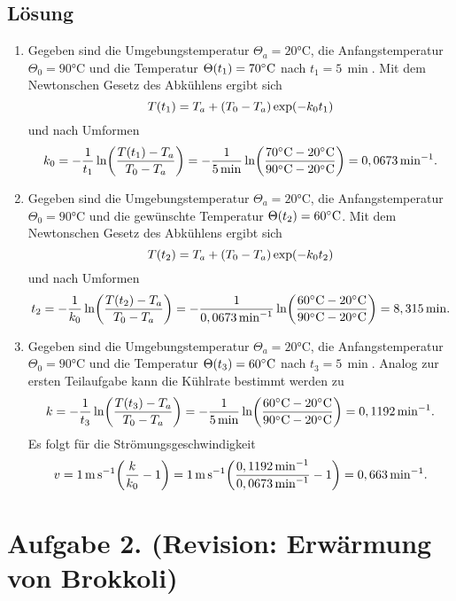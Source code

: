 \documentclass[german,12pt]{homework}
\DeclarePairedDelimiter{\enbrace}{(}{)}
\newcommand{\sis}[1]{\,\si{#1}}
\newcommand{\degC}{\si{\degreeCelsius}}
\begin{document}
    \subsection*{Lösung}
    \begin{enumerate}
        \item Gegeben sind die Umgebungstemperatur \(\Theta_a = 20\degC\), die
        Anfangstemperatur \(\Theta_0 = 90\degC\) und die Temperatur
        \(\Theta\enbrace*{t_1} = 70\degC\) nach \(t_1 = 5\,\si{\min}\). Mit dem
        Newtonschen Gesetz des Abkühlens ergibt sich
        \[T\enbrace*{t_1} = T_a + \enbrace*{T_0 - T_a}\exp\enbrace*{-k_0t_1}\]
        und nach Umformen
        \[k_0 = -\frac{1}{t_1}\ln\enbrace*{\frac{T\enbrace*{t_1} - T_a}{T_0 -
        T_a}} = -\frac{1}{5\sis{\minute}}\ln\enbrace*{\frac{70\degC - 20\degC}
        {90\degC - 20\degC}} = 0,0673\sis{\per\minute}.\]
        \item  Gegeben sind die Umgebungstemperatur \(\Theta_a = 20\degC\), die
        Anfangstemperatur \(\Theta_0 = 90\degC\) und die gewünschte Temperatur
        \(\Theta\enbrace*{t_2} = 60\degC\). Mit dem Newtonschen Gesetz des
        Abkühlens ergibt sich
        \[T\enbrace*{t_2} = T_a + \enbrace*{T_0 - T_a}\exp\enbrace*{-k_0t_2}\]
        und nach Umformen
        \[t_2 = -\frac{1}{k_0}\ln\enbrace*{\frac{T\enbrace*{t_2} - T_a}{T_0 -
        T_a}} = -\frac{1}{0,0673\sis{\per\minute}}\ln\enbrace*{\frac{60\degC -
        20\degC}{90\degC - 20\degC}} = 8,315\sis{\minute}.\]
        \item Gegeben sind die Umgebungstemperatur \(\Theta_a = 20\degC\), die
        Anfangstemperatur \(\Theta_0 = 90\degC\) und die Temperatur
        \(\Theta\enbrace*{t_3} = 60\degC\) nach \(t_3 = 5\,\si{\min}\). Analog
        zur ersten Teilaufgabe kann die Kühlrate bestimmt werden zu
        \[k = -\frac{1}{t_3}\ln\enbrace*{\frac{T\enbrace*{t_3} - T_a}{T_0 -
        T_a}} = -\frac{1}{5\sis{\minute}}\ln\enbrace*{\frac{60\degC - 20\degC}
        {90\degC - 20\degC}} = 0,1192\sis{\per\minute}.\]
        Es folgt für die Strömungsgeschwindigkeit
        \[v = 1\sis{\meter\per\second}\enbrace*{\frac{k}{k_0} - 1} =
        1\sis{\meter\per\second}\enbrace*{\frac{0,1192\sis{\per\minute}}{0,0673\sis{\per\minute}} - 1} = 0,663\sis{\per\minute}.\]
    \end{enumerate}

    \section*{Aufgabe 2. (Revision: Erwärmung von Brokkoli)}
\end{document}
